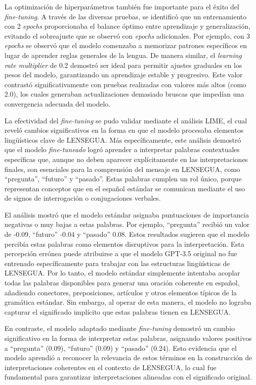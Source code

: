 La optimización de hiperparámetros también fue importante para el éxito del \textit{fine-tuning}. A través de las diversas pruebas, se identificó que un entrenamiento con 2 \textit{epochs} proporcionaba el balance óptimo entre aprendizaje y generalización, evitando el sobreajuste que se observó con \textit{epochs} adicionales. Por ejemplo, con 3 \textit{epochs} se observó que el modelo comenzaba a memorizar patrones específicos en lugar de aprender reglas generales de la lengua. De manera similar, el \textit{learning rate multiplier} de 0.2 demostró ser ideal para permitir ajustes graduales en los pesos del modelo, garantizando un aprendizaje estable y progresivo. Este valor contrastó significativamente con pruebas realizadas con valores más altos (como 2.0), los cuales generaban actualizaciones demasiado bruscas que impedían una convergencia adecuada del modelo.

La efectividad del \textit{fine-tuning} se pudo validar mediante el análisis LIME, el cual reveló cambios significativos en la forma en que el modelo procesaba elementos lingüísticos clave de LENSEGUA. Más específicamente, este análisis demostró que el modelo \textit{fine-tuneado} logró aprender a interpretar palabras contextuales específicas que, aunque no deben aparecer explícitamente en las interpretaciones finales, son esenciales para la comprensión del mensaje en LENSEGUA, como “pregunta”, “futuro” y “pasado”. Estas palabras cumplen un rol único, porque representan conceptos que en el español estándar se comunican mediante el uso de signos de interrogación o conjugaciones verbales.

El análisis mostró que el modelo estándar asignaba puntuaciones de importancia negativas o muy bajas a estas palabras. Por ejemplo, “pregunta” recibió un valor de -0.09, “futuro” -0.04 y “pasado” 0.08. Estos resultados sugieren que el modelo percibía estas palabras como elementos disruptivos para la interpretación. Esta percepción errónea puede atribuirse a que el modelo GPT-3.5 original no fue entrenado específicamente para trabajar con las estructuras lingüísticas de LENSEGUA. Por lo tanto, el modelo estándar simplemente intentaba acoplar todas las palabras disponibles para generar una oración coherente en español, añadiendo conectores, preposiciones, artículos y otros elementos típicos de la gramática estándar. Sin embargo, al operar de esta manera, el modelo no lograba capturar el significado implícito que estas palabras tienen en LENSEGUA.

En contraste, el modelo adaptado mediante \textit{fine-tuning} demostró un cambio significativo en la forma de interpretar estas palabras, asignando valores positivos a “pregunta” (0.09), “futuro” (0.09) y “pasado” (0.24). Esto evidencia que el modelo aprendió a reconocer la relevancia de estos términos en la construcción de interpretaciones coherentes en el contexto de LENSEGUA, lo cual fue fundamental para garantizar interpretaciones alineadas con el significado original.

